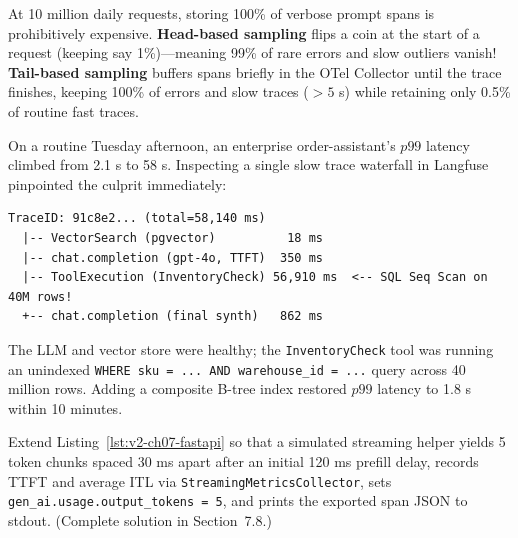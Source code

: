 \begin{underthehoodbox}
At 10 million daily requests, storing 100\% of verbose prompt spans is prohibitively expensive. \textbf{Head-based sampling} flips a coin at the start of a request (keeping say 1\%)—meaning 99\% of rare errors and slow outliers vanish! \textbf{Tail-based sampling} buffers spans briefly in the OTel Collector until the trace finishes, keeping 100\% of errors and slow traces ($>5$ s) while retaining only 0.5\% of routine fast traces.
\end{underthehoodbox}

\begin{realworldbox}
On a routine Tuesday afternoon, an enterprise order-assistant's $p99$ latency climbed from 2.1 s to 58 s. Inspecting a single slow trace waterfall in Langfuse pinpointed the culprit immediately:
\begin{lstlisting}[basicstyle=\ttfamily\scriptsize]
TraceID: 91c8e2... (total=58,140 ms)
  |-- VectorSearch (pgvector)          18 ms
  |-- chat.completion (gpt-4o, TTFT)  350 ms
  |-- ToolExecution (InventoryCheck) 56,910 ms  <-- SQL Seq Scan on 40M rows!
  +-- chat.completion (final synth)   862 ms
\end{lstlisting}
The LLM and vector store were healthy; the \texttt{InventoryCheck} tool was running an unindexed \texttt{WHERE sku = ... AND warehouse\_id = ...} query across 40 million rows. Adding a composite B-tree index restored $p99$ latency to 1.8 s within 10 minutes.
\end{realworldbox}

\begin{tryityourselfbox}
Extend Listing~\ref{lst:v2-ch07-fastapi} so that a simulated streaming helper yields 5 token chunks spaced 30 ms apart after an initial 120 ms prefill delay, records TTFT and average ITL via \texttt{StreamingMetricsCollector}, sets \texttt{gen\_ai.usage.output\_tokens = 5}, and prints the exported span JSON to stdout. (Complete solution in Section~7.8.)
\end{tryityourselfbox}

